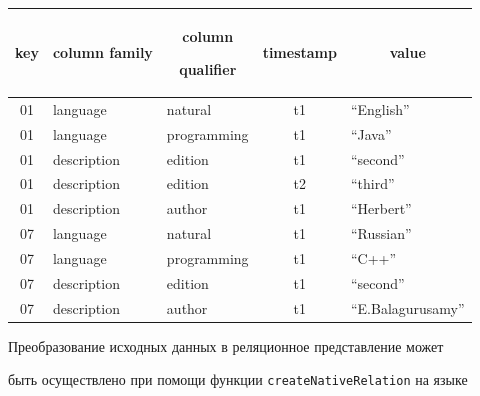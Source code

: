 \begin{table}\small %

\begin{center}


\vspace*{2ex}



\begin{tabular}{|c|l|l|c|l|}

\hline

key&\multicolumn{1}{c|}{column family}&\multicolumn{1}{c|}{column

qualifier}&timestamp&\multicolumn{1}{c|}{value}\\

\hline

01 &language &natural &t1 &``English''\\

01 &language &programming &t1 &``Java''\\

01 &description &edition &t1 &``second''\\

01 &description &edition &t2 &``third''\\

01 &description &author &t1 &``Herbert''\\

07 &language &natural &t1 &``Russian''\\

07 &language &programming &t1 &``C++''\\

07 &description &edition &t1 &``second''\\

07 &description &author &t1 &``E.Balagurusamy''\\

\hline

\end{tabular}

\end{center}

       \vspace*{-12pt}

\end{table}



      Преобразование исходных данных в реляционное представление может

быть осуществлено при помощи функции \verb"createNativeRelation" на языке

